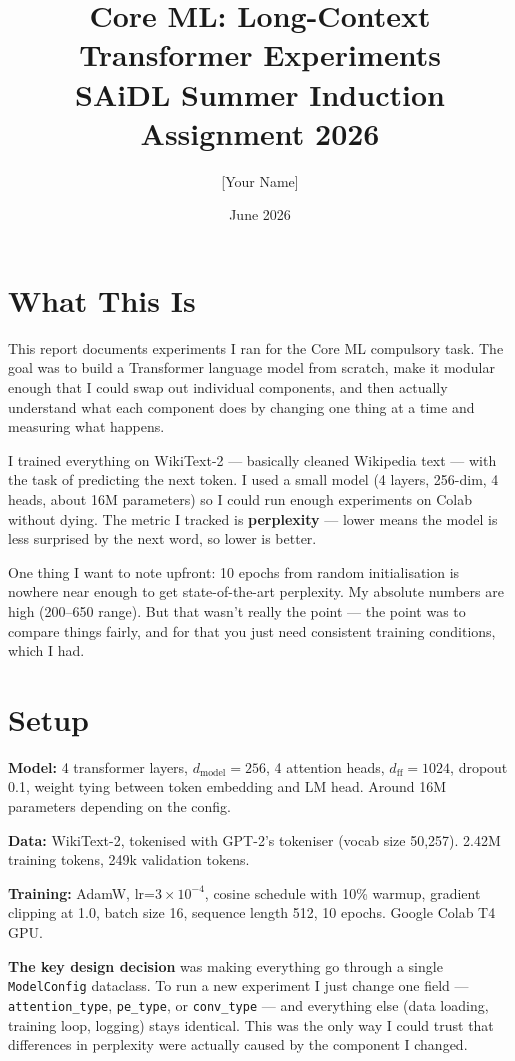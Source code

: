 \documentclass[12pt,a4paper]{article}
\title{\textbf{Core ML: Long-Context Transformer Experiments}\\[0.4em]
\large SAiDL Summer Induction Assignment 2026}
\author{[Your Name]}
\date{June 2026}
\begin{document}
\maketitle
\tableofcontents
\newpage

\section{What This Is}

This report documents experiments I ran for the Core ML compulsory task. The goal was to build a Transformer language model from scratch, make it modular enough that I could swap out individual components, and then actually understand what each component does by changing one thing at a time and measuring what happens.

I trained everything on WikiText-2 — basically cleaned Wikipedia text — with the task of predicting the next token. I used a small model (4 layers, 256-dim, 4 heads, about 16M parameters) so I could run enough experiments on Colab without dying. The metric I tracked is \textbf{perplexity} — lower means the model is less surprised by the next word, so lower is better.

One thing I want to note upfront: 10 epochs from random initialisation is nowhere near enough to get state-of-the-art perplexity. My absolute numbers are high (200--650 range). But that wasn't really the point — the point was to compare things fairly, and for that you just need consistent training conditions, which I had.

\section{Setup}

\textbf{Model:} 4 transformer layers, $d_{\text{model}}=256$, 4 attention heads, $d_{\text{ff}}=1024$, dropout 0.1, weight tying between token embedding and LM head. Around 16M parameters depending on the config.

\textbf{Data:} WikiText-2, tokenised with GPT-2's tokeniser (vocab size 50,257). 2.42M training tokens, 249k validation tokens.

\textbf{Training:} AdamW, lr=$3\times10^{-4}$, cosine schedule with 10\% warmup, gradient clipping at 1.0, batch size 16, sequence length 512, 10 epochs. Google Colab T4 GPU.

\textbf{The key design decision} was making everything go through a single \texttt{ModelConfig} dataclass. To run a new experiment I just change one field — \texttt{attention\_type}, \texttt{pe\_type}, or \texttt{conv\_type} — and everything else (data loading, training loop, logging) stays identical. This was the only way I could trust that differences in perplexity were actually caused by the component I changed.
\end{document}
